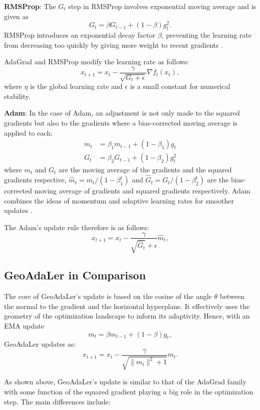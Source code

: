 \documentclass{article}
\begin{document}
\textbf{RMSProp}: The $G_t$ step in RMSProp involves exponential moving average and is given as
    \[
    G_t = \beta G_{t-1} + (1 - \beta) g_t^2.
    \]
    RMSProp introduces an exponential decay factor $\beta$, preventing the learning rate from decreasing too quickly by giving more weight to recent gradients \citep{hinton2012neural}.
    
AdaGrad and RMSProp modify the learning rate as follows:
\[
x_{t+1} = x_t - \frac{\gamma}{\sqrt{G_t + \epsilon}} \nabla f_t(x_t),
\]
where $\eta$ is the global learning rate and $\epsilon$ is a small constant for numerical stability.

      
\textbf{Adam}: In the case of Adam, an adjustment is not only made to the squared gradients but also to the gradients where a bias-corrected moving average is applied to each:
\begin{align*}
    m_t &= \beta_1 m_{t-1} + (1 - \beta_1) g_t\\
    G_t &= \beta_2 G_{t-1} + (1 - \beta_2) g_t^2
\end{align*} 
where $m_t$ and $G_t$ are the moving average of the gradients and the squared gradients respective, $\hat{m}_t = m_t/(1-\beta_1^t)$ and $\hat{G}_t = G_t/(1-\beta_2^t)$ are the bias-corrected moving average of gradients and  squared gradients respectively. Adam combines the ideas of momentum and adaptive learning rates for smoother updates \citep{kingma2014adam}.

The Adam's update rule therefore is as follows:
\[
x_{t+1} = x_t - \frac{\gamma}{\sqrt{\hat{G}_t} + \epsilon}\hat{m}_t,
\]

\subsection{GeoAdaLer in Comparison}
The core of GeoAdaLer’s update is based on the cosine of the angle $\theta$ between the normal to the gradient and the horizontal hyperplane. It effectively uses the geometry of the optimization landscape to inform its adaptivity. Hence, with an EMA update
\[
m_t = \beta m_{t-1} + (1 - \beta) g_t,
\]
GeoAdaLer updates as:
\[
x_{t+1} = x_t - \frac{\gamma}{\sqrt{\|m_t\|^2 + 1}} m_t.
\]

\noindent
As shown above, GeoAdaLer's update is similar to that of the AdaGrad family with some function of the squared gradient playing a big role in the optimization step. The main differences include:
\end{document}
